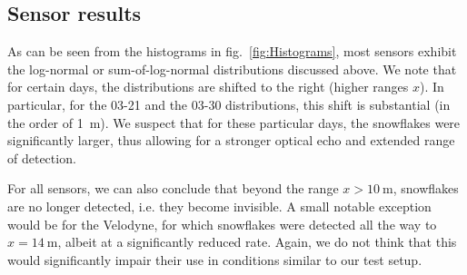 
\subsection{Sensor results}
As can be seen from the histograms in fig.~\ref{fig:Histograms}, most sensors exhibit the log-normal or sum-of-log-normal distributions discussed above. We note that for certain days, the distributions are shifted to the right (higher ranges $x$). In particular, for the 03-21 and the 03-30 distributions, this shift is substantial (in the order of \SI{1}{\meter}). We suspect that for these particular days, the snowflakes were significantly larger, thus allowing for a stronger optical echo and extended range of detection. 

For all sensors, we can also conclude that beyond the range $x>\SI{10}{\meter}$, snowflakes are no longer detected, i.e. they become invisible. A small notable exception would be for the Velodyne, for which snowflakes were detected all the way to $x=\SI{14}{\meter}$, albeit at a significantly reduced rate. Again, we do not think that this would significantly impair their use in conditions similar to our test setup. 


